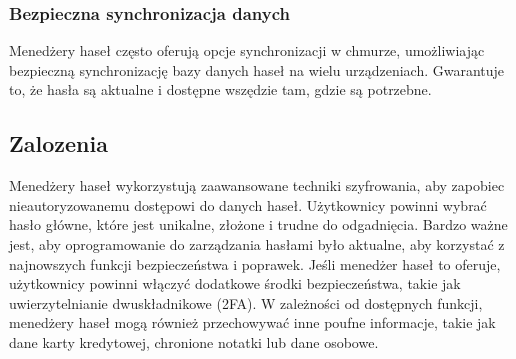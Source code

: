 \subsubsection{Bezpieczna synchronizacja danych}
Menedżery haseł często oferują opcje synchronizacji w chmurze, umożliwiając bezpieczną synchronizację bazy danych haseł na wielu urządzeniach. Gwarantuje to, że hasła są aktualne i dostępne wszędzie tam, gdzie są potrzebne.

\subsection{Zalozenia}
Menedżery haseł wykorzystują zaawansowane techniki szyfrowania, aby zapobiec nieautoryzowanemu dostępowi do danych haseł.
Użytkownicy powinni wybrać hasło główne, które jest unikalne, złożone i trudne do odgadnięcia.
Bardzo ważne jest, aby oprogramowanie do zarządzania hasłami było aktualne, aby korzystać z najnowszych funkcji bezpieczeństwa i poprawek.
Jeśli menedżer haseł to oferuje, użytkownicy powinni włączyć dodatkowe środki bezpieczeństwa, takie jak uwierzytelnianie dwuskładnikowe (2FA).
W zależności od dostępnych funkcji, menedżery haseł mogą również przechowywać inne poufne informacje, takie jak dane karty kredytowej, chronione notatki lub dane osobowe.
